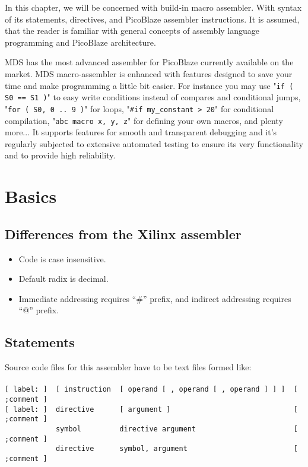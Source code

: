 In this chapter, we will be concerned with build-in macro assembler. With syntax of its statements, directives, and PicoBlaze assembler instructions. It is assumed, that the reader is familiar with general concepts of assembly language programming and PicoBlaze architecture.

MDS has the most advanced assembler for PicoBlaze currently available on the market. MDS macro-assembler is enhanced with features designed to save your time and make programming a little bit easier. For instance you may use "\verb'if ( S0 == S1 )'" to easy write conditions instead of compares and conditional jumps, "\verb'for ( S0, 0 .. 9 )'" for loops, "\verb'#if my_constant > 20'" for conditional compilation, "\verb'abc macro x, y, z'" for defining your own macros, and plenty more... It supports features for smooth and transparent debugging and it's regularly subjected to extensive automated testing to ensure its very functionality and to provide high reliability.

\section{Basics}
    \subsection{Differences from the Xilinx assembler}
        \begin{itemize}
            \item Code is case insensitive.
            \item Default radix is decimal.
            \item Immediate addressing requires ``\#'' prefix, and indirect addressing requires ``@'' prefix.
        \end{itemize}

    \subsection{Statements}
        Source code files for this assembler have to be text files formed like:\\
        ~\\
        \verb'[ label: ]  [ instruction  [ operand [ , operand [ , operand ] ] ]  [ ;comment ]'\\
        \verb'[ label: ]  directive      [ argument ]                             [ ;comment ]'\\
        \verb'            symbol         directive argument                       [ ;comment ]'\\
        \verb'            directive      symbol, argument                         [ ;comment ]'\\

